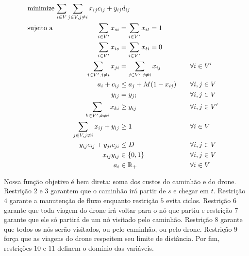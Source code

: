 \documentclass[11pt]{article}
\begin{document}
\begin{alignat}{4}
& \omit\rlap{minimize  $\displaystyle \sum_{i \in V} \sum_{j \in V ,j \neq i} x_{ij} c_{ij} + y_{ij} d_{ij} $} \\
& \mbox{sujeito a}&& \quad & \sum_{i \in V'} x_{si} &= \sum_{i \in V'} x_{it} = 1                 & \quad &  \\
&                 &&       &  \sum_{i \in V'} x_{is} &= \sum_{i \in V'} x_{ti} = 0                 & \quad &  \\
&                 &&       & \sum_{j \in V', j \neq i} x_{ji} &= \sum_{j \in V', j \neq i} x_{ij}     &       & \forall i \in V'   \\
&                 &&       & a_i + c_{ij} &\leq a_j + M(1 - x_{ij})                             &       & \forall i,j \in V \\
&                 &&       & y_{ij} &= y_{ji}                                                   &       & \forall i,j \in V   \\
&                 &&       & \sum_{k \in V', k \neq i} x_{ki} &\geq y_{ij}                                &       & \forall i,j \in V' \\
&                 &&       & \sum_{j \in V, j \neq i} x_{ij} + y_{ij} &\geq 1                        &       & \forall i \in V   \\
&                 &&       & y_{ij} c_{ij} + y_{ji} c_{ji} &\leq D                               &       & \forall i,j \in V  \\
&                 &&       & x_{ij} y_{ij} &\in \{0,1\}                                         &       & \forall i,j \in V \\
&                 &&       & a_i &\in \mathbb{R}_+                                             &         & \forall i \in V
\end{alignat}

Nossa função objetivo é bem direta: soma dos custos do caminhão e do drone. Restrição \(2\) e \(3\) garantem que o caminhão irá partir de \(s\) e chegar em \(t\). Restrição \(4\) garante a manutenção de fluxo enquanto restrição \(5\) evita ciclos. Restrição \(6\) garante que toda viagem do drone irá voltar para o nó que partiu e restrição \(7\) garante que ele só partirá de um nó visitado pelo caminhão. Restrição \(8\) garante que todos os nós serão visitados, ou pelo caminhão, ou pelo drone. Restrição \(9\) força que as viagens do drone respeitem seu limite de distância. Por fim, restrições \(10\) e \(11\) definem o domínio das variáveis.
\end{document}
